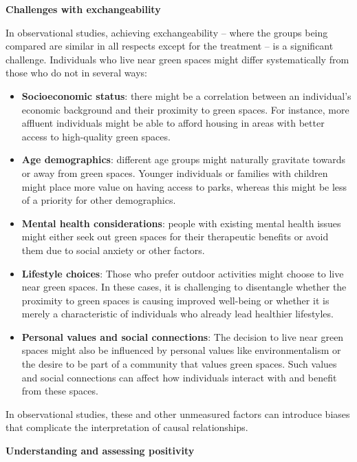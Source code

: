 \documentclass[
  singlecolumn]{article}
\begin{document}
\textbf{Challenges with exchangeability}

In observational studies, achieving exchangeability -- where the groups
being compared are similar in all respects except for the treatment --
is a significant challenge. Individuals who live near green spaces might
differ systematically from those who do not in several ways:

\begin{itemize}
\item
  \textbf{Socioeconomic status}: there might be a correlation between an
  individual's economic background and their proximity to green spaces.
  For instance, more affluent individuals might be able to afford
  housing in areas with better access to high-quality green spaces.
\item
  \textbf{Age demographics}: different age groups might naturally
  gravitate towards or away from green spaces. Younger individuals or
  families with children might place more value on having access to
  parks, whereas this might be less of a priority for other
  demographics.
\item
  \textbf{Mental health considerations}: people with existing mental
  health issues might either seek out green spaces for their therapeutic
  benefits or avoid them due to social anxiety or other factors.
\item
  \textbf{Lifestyle choices}: Those who prefer outdoor activities might
  choose to live near green spaces. In these cases, it is challenging to
  disentangle whether the proximity to green spaces is causing improved
  well-being or whether it is merely a characteristic of individuals who
  already lead healthier lifestyles.
\item
  \textbf{Personal values and social connections}: The decision to live
  near green spaces might also be influenced by personal values like
  environmentalism or the desire to be part of a community that values
  green spaces. Such values and social connections can affect how
  individuals interact with and benefit from these spaces.
\end{itemize}

In observational studies, these and other unmeasured factors can
introduce biases that complicate the interpretation of causal
relationships.

\textbf{Understanding and assessing positivity}
\end{document}
